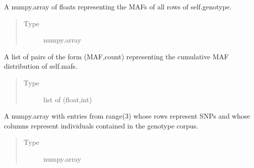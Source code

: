 \documentclass[a4paper,10pt,english]{sphinxhowto}
\begin{document}
\begin{fulllineitems}
\begin{fulllineitems}
\end{fulllineitems}


\begin{fulllineitems}
\label{\detokenize{utils:utils.data_simulator.DataSimulator.mafs}}
A numpy.array of floats representing the MAFs of all rows of self.genotype.
\begin{quote}\begin{description}
\item[{Type}] \leavevmode
numpy.array

\end{description}\end{quote}

\end{fulllineitems}


\begin{fulllineitems}
\label{\detokenize{utils:utils.data_simulator.DataSimulator.cum_mafs}}
A list of pairs of the form (MAF,count) representing the cumulative MAF distribution of self.mafs.
\begin{quote}\begin{description}
\item[{Type}] \leavevmode
list of (float,int)

\end{description}\end{quote}

\end{fulllineitems}


\begin{fulllineitems}
\label{\detokenize{utils:utils.data_simulator.DataSimulator.corpus_genotype}}
A numpy.array with entries from range(3) whose rows represent SNPs and whose
columns represent individuals contained in the genotype corpus.
\begin{quote}\begin{description}
\item[{Type}] \leavevmode
numpy.array


\end{description}
\end{quote}
\end{fulllineitems}
\end{fulllineitems}
\end{document}
